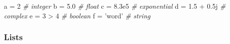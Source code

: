 \documentclass[10pt,a4paperpaper,twocolumn]{article}
\newenvironment{Shaded}{}{}
\newcommand{\DecValTok}[1]{\textcolor[rgb]{0.25,0.63,0.44}{{#1}}}
\newcommand{\FloatTok}[1]{\textcolor[rgb]{0.25,0.63,0.44}{{#1}}}
\newcommand{\StringTok}[1]{\textcolor[rgb]{0.25,0.44,0.63}{{#1}}}
\newcommand{\CommentTok}[1]{\textcolor[rgb]{0.38,0.63,0.69}{\textit{{#1}}}}
\newcommand{\OtherTok}[1]{\textcolor[rgb]{0.00,0.44,0.13}{{#1}}}
\newcommand{\OperatorTok}[1]{\textcolor[rgb]{0.40,0.40,0.40}{{#1}}}
\newcommand{\NormalTok}[1]{{#1}}
\begin{document}
\begin{Shaded}
\begin{Highlighting}[]
\NormalTok{a }\OperatorTok{=} \DecValTok{2}           \CommentTok{# integer}
\NormalTok{b }\OperatorTok{=} \FloatTok{5.0}         \CommentTok{# float}
\NormalTok{c }\OperatorTok{=} \FloatTok{8.3e5}       \CommentTok{# exponential}
\NormalTok{d }\OperatorTok{=} \FloatTok{1.5} \OperatorTok{+}\OtherTok{ 0.5j}  \CommentTok{# complex}
\NormalTok{e }\OperatorTok{=} \DecValTok{3} \OperatorTok{>} \DecValTok{4}       \CommentTok{# boolean}
\NormalTok{f }\OperatorTok{=} \StringTok{'word'}      \CommentTok{# string}
\end{Highlighting}
\end{Shaded}

\hypertarget{lists}{\subsubsection{Lists}\label{lists}}
\end{document}
